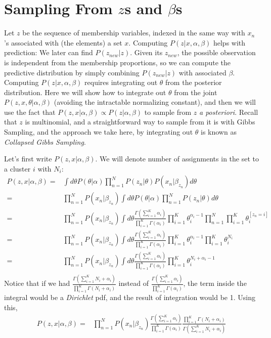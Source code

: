 \documentclass{article}%
\begin{document}
\section{Sampling From $z$s and $\beta$s}
Let $z$ be the sequence of membership variables, indexed in the same way with $x_n$'s associated with (the elements) a set $x$. Computing $P(z|x, \alpha, \beta)$ helps with prediction: We later can find $P(z_{new}|z)$. Given its $z_{new}$, the possible observation is independent from the membership proportions, so we can compute the predictive distribution by simply combining $P(z_{new}|z)$ with associated $\beta$. Computing $P(z|x, \alpha, \beta)$ requires integrating out $\theta$ from the posterior distribution. Here we will show how to integrate out $\theta$ from the joint  $P(z, x, \theta|\alpha, \beta)$ (avoiding the intractable normalizing constant), and then we will use the fact that $P(z, x|\alpha, \beta) \propto P(z|\alpha, \beta)$ to sample from $z$ \textit{a posteriori}. Recall that $z$ is multinomial, and a straightforward way to sample from it is with Gibbs Sampling, and the approach we take here, by integrating out $\theta$ is known as \textit{Collapsed Gibbs Sampling}.

Let's first write $P(z, x|\alpha, \beta)$. We will denote number of assignments in the set to a cluster $i$ with $N_i$:
\begin{align*}
P(z, x|\alpha, \beta) =& \int d\theta P(\theta|\alpha) \prod_{n=1}^{N} P(z_n |\theta) P(x_n|\beta_{z_n}) d\theta\\
=&  \prod_{n=1}^{N} P(x_n|\beta_{z_n})  \int d\theta P(\theta|\alpha) \prod_{n=1}^{N} P(z_n |\theta) d\theta\\
=&  \prod_{n=1}^{N} P(x_n|\beta_{z_n}) \int d\theta \frac{\Gamma(\sum_{i=1}^K \alpha_i)}{\prod_{i=1}^K \Gamma(\alpha_i)}  \prod_{i=1}^K\theta_i^{\alpha_i - 1} \prod_{n=1}^N \prod_{i=1}^K \theta_i^{[z_n = i]}\\
=& \prod_{n=1}^{N} P(x_n|\beta_{z_n})   \int d\theta \frac{\Gamma(\sum_{i=1}^K \alpha_i)}{\prod_{i=1}^K \Gamma(\alpha_i)} \prod_{i=1}^K\theta_i^{\alpha_i - 1} \prod_{i=1}^K \theta_i^{N_i}\\
=& \prod_{n=1}^{N} P(x_n|\beta_{z_n})  \int d\theta \frac{\Gamma(\sum_{i=1}^K \alpha_i)}{\prod_{i=1}^K \Gamma(\alpha_i)}  \prod_{i=1}^K \theta_i^{N_i + \alpha_i -1}\\
\end{align*}
Notice that if we had $\frac{\Gamma(\sum_{i=1}^K N_i + \alpha_i)}{\prod_{i=1}^K \Gamma(N_i + \alpha_i)}$ instead of $\frac{\Gamma(\sum_{i=1}^K \alpha_i)}{\prod_{i=1}^K \Gamma(\alpha_i)}$, the term inside the integral would be a \textit{Dirichlet} pdf, and the result of integration would be 1. Using this, 
\begin{align*}
P(z, x|\alpha, \beta) =& \prod_{n=1}^{N} P(x_n|\beta_{z_n}) \frac{\Gamma(\sum_{i=1}^K \alpha_i)}{\prod_{i=1}^K \Gamma(\alpha_i)}  \frac{\prod_{i=1}^K \Gamma(N_i + \alpha_i)}{\Gamma(\sum_{i=1}^K N_i + \alpha_i)}\\
\end{align*}
\end{document}

